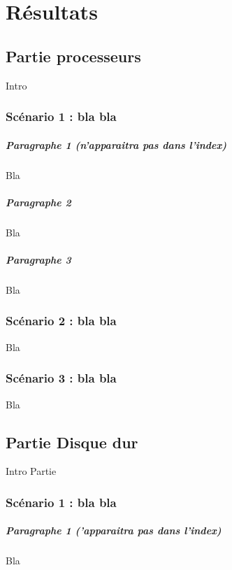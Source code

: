 \chapter{Résultats}

\section{Partie processeurs}

Intro

\subsection{Scénario 1 : bla bla }

\paragraph*{Paragraphe 1 (n'apparaitra pas dans l'index)} Bla

\paragraph*{Paragraphe 2} Bla

\paragraph*{Paragraphe 3} Bla

\subsection{Scénario 2 : bla bla }

Bla

\subsection{Scénario 3 : bla bla }

Bla

\section{Partie Disque dur }

Intro
Partie

\subsection{Scénario 1 : bla bla }

\paragraph*{Paragraphe 1 ('apparaitra pas dans l'index)} Bla

